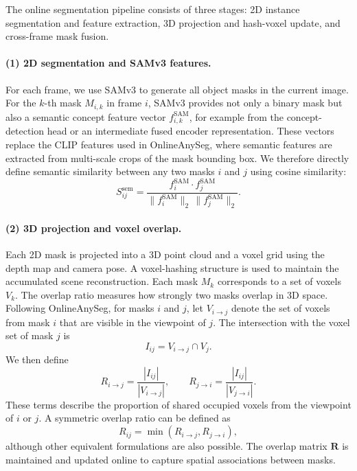\documentclass[12pt,a4paper]{article}
\begin{document}
The online segmentation pipeline consists of three stages: 2D instance segmentation and feature extraction, 3D projection and hash-voxel update, and cross-frame mask fusion.

\paragraph{(1) 2D segmentation and SAMv3 features.}
For each frame, we use SAMv3 to generate all object masks in the current image. For the $k$-th mask $M_{i,k}$ in frame $i$, SAMv3 provides not only a binary mask but also a semantic concept feature vector $f_{i,k}^{\text{SAM}}$, for example from the concept-detection head or an intermediate fused encoder representation. These vectors replace the CLIP features used in OnlineAnySeg, where semantic features are extracted from multi-scale crops of the mask bounding box. We therefore directly define semantic similarity between any two masks $i$ and $j$ using cosine similarity:
\begin{equation}
S^\text{sem}_{ij}=
\frac{f^\text{SAM}_{i}\cdot f^\text{SAM}_{j}}
{\lVert f^\text{SAM}_{i}\rVert_2\,\lVert f^\text{SAM}_{j}\rVert_2}.
\end{equation}

\paragraph{(2) 3D projection and voxel overlap.}
Each 2D mask is projected into a 3D point cloud and a voxel grid using the depth map and camera pose. A voxel-hashing structure is used to maintain the accumulated scene reconstruction. Each mask $M_k$ corresponds to a set of voxels $V_k$. The overlap ratio measures how strongly two masks overlap in 3D space. Following OnlineAnySeg, for masks $i$ and $j$, let $V_{i\rightarrow j}$ denote the set of voxels from mask $i$ that are visible in the viewpoint of $j$. The intersection with the voxel set of mask $j$ is
\begin{equation}
I_{ij}=V_{i\rightarrow j}\cap V_j.
\end{equation}
We then define
\begin{equation}
R_{i\rightarrow j}=\frac{|I_{ij}|}{|V_{i\rightarrow j}|},
\qquad
R_{j\rightarrow i}=\frac{|I_{ij}|}{|V_{j\rightarrow i}|}.
\end{equation}
These terms describe the proportion of shared occupied voxels from the viewpoint of $i$ or $j$. A symmetric overlap ratio can be defined as
\begin{equation}
R_{ij}=\min\left(R_{i\rightarrow j},R_{j\rightarrow i}\right),
\end{equation}
although other equivalent formulations are also possible. The overlap matrix $\mathbf{R}$ is maintained and updated online to capture spatial associations between masks.
\end{document}
